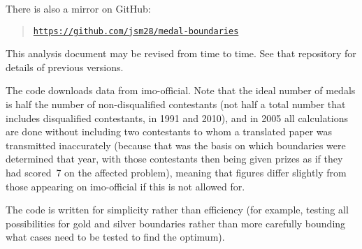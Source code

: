 \documentclass[a4paper,11pt]{article}
\begin{document}
There is also a mirror on GitHub:

\begin{quote}
\texttt{\href{https://github.com/jsm28/medal-boundaries}{https://github.com/jsm28/medal-boundaries}}
\end{quote}

This analysis document may be revised from time to time.  See that
repository for details of previous versions.

The code downloads data from imo-official.  Note that the ideal number
of medals is half the number of non-disqualified contestants (not half
a total number that includes disqualified contestants, in 1991 and
2010), and in 2005 all calculations are done without including two
contestants to whom a translated paper was transmitted inaccurately
(because that was the basis on which boundaries were determined that
year, with those contestants then being given prizes as if they had
scored~7 on the affected problem), meaning that figures differ
slightly from those appearing on imo-official if this is not allowed
for.

The code is written for simplicity rather than efficiency (for
example, testing all possibilities for gold and silver boundaries
rather than more carefully bounding what cases need to be tested to
find the optimum).
\end{document}
